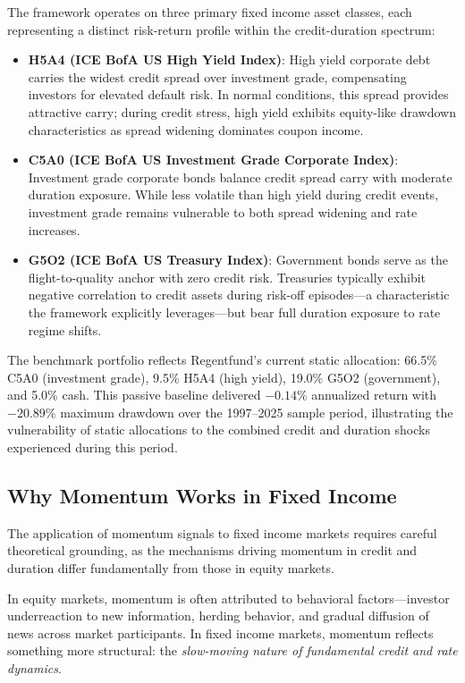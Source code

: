 \documentclass[11pt]{article}
\begin{document}
The framework operates on three primary fixed income asset classes, each representing a distinct risk-return profile within the credit-duration spectrum:

\begin{itemize}
    \item \textbf{H5A4 (ICE BofA US High Yield Index)}: High yield corporate debt carries the widest credit spread over investment grade, compensating investors for elevated default risk. In normal conditions, this spread provides attractive carry; during credit stress, high yield exhibits equity-like drawdown characteristics as spread widening dominates coupon income.

    \item \textbf{C5A0 (ICE BofA US Investment Grade Corporate Index)}: Investment grade corporate bonds balance credit spread carry with moderate duration exposure. While less volatile than high yield during credit events, investment grade remains vulnerable to both spread widening and rate increases.

    \item \textbf{G5O2 (ICE BofA US Treasury Index)}: Government bonds serve as the flight-to-quality anchor with zero credit risk. Treasuries typically exhibit negative correlation to credit assets during risk-off episodes---a characteristic the framework explicitly leverages---but bear full duration exposure to rate regime shifts.
\end{itemize}

The benchmark portfolio reflects Regentfund's current static allocation: 66.5\% C5A0 (investment grade), 9.5\% H5A4 (high yield), 19.0\% G5O2 (government), and 5.0\% cash. This passive baseline delivered $-0.14\%$ annualized return with $-20.89\%$ maximum drawdown over the 1997--2025 sample period, illustrating the vulnerability of static allocations to the combined credit and duration shocks experienced during this period.

\subsection{Why Momentum Works in Fixed Income}

The application of momentum signals to fixed income markets requires careful theoretical grounding, as the mechanisms driving momentum in credit and duration differ fundamentally from those in equity markets.

In equity markets, momentum is often attributed to behavioral factors---investor underreaction to new information, herding behavior, and gradual diffusion of news across market participants. In fixed income markets, momentum reflects something more structural: the \textit{slow-moving nature of fundamental credit and rate dynamics}.
\end{document}
